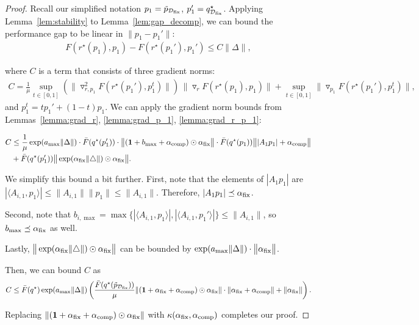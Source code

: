 \begin{proof}

Recall our simplified notation $p_1 = \tilde{p}_{\mathcal{D}_{\text{fix}}}$, $p_1' = q^\star_{\mathcal{D}_{\text{fix}}}$.
Applying Lemma~\ref{lem:stability} to Lemma~\ref{lem:gap_decomp}, we can bound the performance gap to be linear in $\| p_1 - p_1' \|$:
\begin{align*}
    F(r^\star(p_1),p_1)-F(r^\star(p_1'),p_1') \le C \|\Delta\|,
\end{align*}


where $C$ is a term that consists of three gradient norms:
\begin{align*}
        C = \frac{1}{\mu} \sup_{t\in[0,1]} \left( \|\triangledown^2_{r,p_1}F(r^\star(p_1'),p_1^t)\| \right) \,\|\triangledown_r F(r^\star(p_1),p_1)\| + \sup_{t\in[0,1]}\|\triangledown_{p_1}F(r^\star(p_1'),p_1^t)\|,
\end{align*}
and $p_1^t=t p_1'+(1-t)p_1$. We can apply the gradient norm bounds from Lemmas~\ref{lemma:grad_r}, \ref{lemma:grad_p_1}, \ref{lemma:grad_r_p_1}:

\begin{align*}
    C &\le \frac{1}{\mu} \exp( a_{\max} \| \Delta \| ) \cdot  \bar{F}(q^\star(p_1')) \cdot \big\| (\mathbf{1} + b_{\max} + \alpha_{\text{comp}}) \odot \alpha_{\text{fix}} \big\| \cdot \bar{F}(q^\star(p_1))  \big\| | A_1 p_1 | + \alpha_{\text{comp}} \big\| \\
    &+ \bar{F}(q^\star(p_1'))  \big\|  \exp( \alpha_{\text{fix}} \|\triangle \|) \odot \alpha_{\text{fix}}   \big\|.
\end{align*}

We simplify this bound a bit further. First, note that the elements of $|A_1 p_1|$ are $| \langle A_{i, 1}, p_1 \rangle| \le \|A_{i, 1}\| \| p_1\| \le \|A_{i, 1}\|$. Therefore, $|A_1 p_1| \preceq \alpha_{\text{fix}}$.

Second, note that $b_{i, \max} = \max\{ |\langle A_{i, 1}, p_1 \rangle|, |\langle A_{i, 1}, p_1' \rangle| \} \le \|A_{i, 1}\|$, so $b_{\max} \preceq \alpha_{\text{fix}}$ as well.

Lastly, $\big\|  \exp( \alpha_{\text{fix}} \|\triangle \|) \odot \alpha_{\text{fix}}   \big\| $ can be bounded by $\exp(a_{\max} \|\Delta\|) \cdot \big\|  \alpha_{\text{fix}} \big\| $.

Then, we can bound $C$ as
\begin{align*}
    C \le \bar{F}(q^\star) \exp(a_{\max} \| \Delta \|) \left( \frac{\bar{F}(q^\star(\tilde{p}_{\mathcal{D}_{\text{fix}}}))}{\mu} \|(\mathbf{1} + \alpha_{\text{fix}} + \alpha_{\text{comp}}) \odot \alpha_{\text{fix}} \| \cdot \|\alpha_{\text{fix}} + \alpha_{\text{comp}} \|  + \|\alpha_{\text{fix}} \| \right).
\end{align*}

Replacing $\|(\mathbf{1} + \alpha_{\text{fix}} + \alpha_{\text{comp}}) \odot \alpha_{\text{fix}} \|$ with $\kappa(\alpha_{\text{fix}}, \alpha_{\text{comp}})$ completes our proof.

\end{proof}

